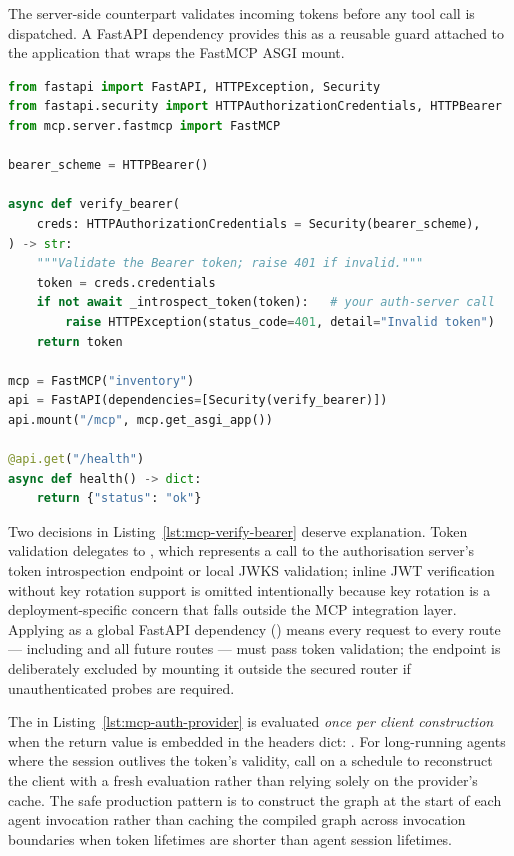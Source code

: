 The server-side counterpart validates incoming tokens before any tool
call is dispatched. A FastAPI dependency provides this as a reusable
guard attached to the application that wraps the FastMCP ASGI mount.

\begin{lstlisting}[language=Python,
                   caption={Server-side Bearer token validation dependency},
                   label={lst:mcp-verify-bearer}]
from fastapi import FastAPI, HTTPException, Security
from fastapi.security import HTTPAuthorizationCredentials, HTTPBearer
from mcp.server.fastmcp import FastMCP

bearer_scheme = HTTPBearer()

async def verify_bearer(
    creds: HTTPAuthorizationCredentials = Security(bearer_scheme),
) -> str:
    """Validate the Bearer token; raise 401 if invalid."""
    token = creds.credentials
    if not await _introspect_token(token):   # your auth-server call
        raise HTTPException(status_code=401, detail="Invalid token")
    return token

mcp = FastMCP("inventory")
api = FastAPI(dependencies=[Security(verify_bearer)])
api.mount("/mcp", mcp.get_asgi_app())

@api.get("/health")
async def health() -> dict:
    return {"status": "ok"}
\end{lstlisting}

Two decisions in Listing~\ref{lst:mcp-verify-bearer} deserve
explanation. Token validation delegates to ,
which represents a call to the authorisation server's token introspection
endpoint or local JWKS validation; inline JWT verification without key
rotation support is omitted intentionally because key rotation is a
deployment-specific concern that falls outside the MCP integration layer.
Applying  as a global FastAPI dependency
() means every request to every
route --- including  and all future routes --- must
pass token validation; the  endpoint is deliberately
excluded by mounting it outside the secured router if unauthenticated
probes are required.

\begin{warningbox}
The  in
Listing~\ref{lst:mcp-auth-provider} is evaluated \emph{once per client
construction} when the return value is embedded in the headers dict:
.
For long-running agents where the session outlives the token's validity,
call  on a schedule to reconstruct the client with
a fresh evaluation rather than relying solely on the provider's cache.
The safe production pattern is to construct the graph at the start of
each agent invocation rather than caching the compiled graph across
invocation boundaries when token lifetimes are shorter than agent
session lifetimes.
\end{warningbox}

